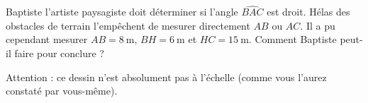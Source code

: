 
\begin{exercice}\label{exosmath-0837}

    Baptiste l'artiste paysagiste doit déterminer si l'angle \( \widehat{BAC}\) est droit. Hélas des obstacles de terrain l'empêchent de mesurer directement \( AB\) ou \( AC\). Il a pu cependant mesurer \( AB=\SI{8}{\meter}\), \( BH=\SI{6}{\meter}\) et \( HC=\SI{15}{\meter}\). Comment Baptiste peut-il faire pour conclure ?

\begin{center}
   
\end{center}
Attention : ce dessin n'est absolument pas à l'échelle (comme vous l'aurez constaté par vous-même).

\end{exercice}
